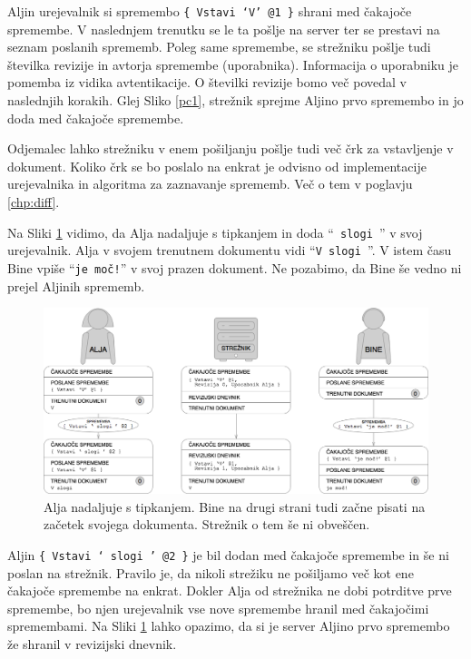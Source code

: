 \documentclass[a4paper, 12pt, twoside]{book}
\begin{document}
Aljin urejevalnik si spremembo {\tt \{ Vstavi ‘V’ @1 \}} shrani med čakajoče spremembe. V naslednjem trenutku se le ta pošlje na server ter se prestavi na seznam poslanih sprememb. Poleg same spremembe, se strežniku pošlje tudi številka revizije in avtorja spremembe (uporabnika). Informacija o uporabniku je pomemba iz vidika avtentikacije. O številki revizije bomo več povedal v naslednjih korakih. Glej Sliko \ref{pc1}, strežnik sprejme Aljino prvo spremembo in jo doda med čakajoče spremembe.

\pagebreak

Odjemalec lahko strežniku v enem pošiljanju pošlje tudi več črk za vstavljenje v dokument. Koliko črk se bo poslalo na enkrat je odvisno od implementacije urejevalnika in algoritma za zaznavanje sprememb. Več o tem v poglavju \ref{chp:diff}.

Na Sliki \ref{pc2} vidimo, da Alja nadaljuje s tipkanjem in doda “{\tt \ slogi }” v svoj urejevalnik. Alja v svojem trenutnem dokumentu vidi “{\tt V slogi }”. V istem času Bine vpiše “{\tt je moč!}” v svoj prazen dokument. Ne pozabimo, da Bine še vedno ni prejel Aljinih sprememb.

\begin{figure}[placement h]
\begin{center}
\includegraphics[width=14cm]{pc2.png}
\end{center}
\caption{Alja nadaljuje s tipkanjem. Bine na drugi strani tudi začne pisati na začetek svojega dokumenta. Strežnik o tem še ni obveščen.}
\label{pc2}
\end{figure}

Aljin {\tt \{ Vstavi ‘ slogi ’ @2 \}} je bil dodan med čakajoče spremembe in še ni poslan na strežnik. Pravilo je, da nikoli strežiku ne pošiljamo več kot ene čakajoče spremembe na enkrat. Dokler Alja od strežnika ne dobi potrditve prve spremembe, bo njen urejevalnik vse nove spremembe hranil med čakajočimi spremembami. Na Sliki \ref{pc2} lahko opazimo, da si je server Aljino prvo spremembo že shranil v revizijski dnevnik.
\end{document}
